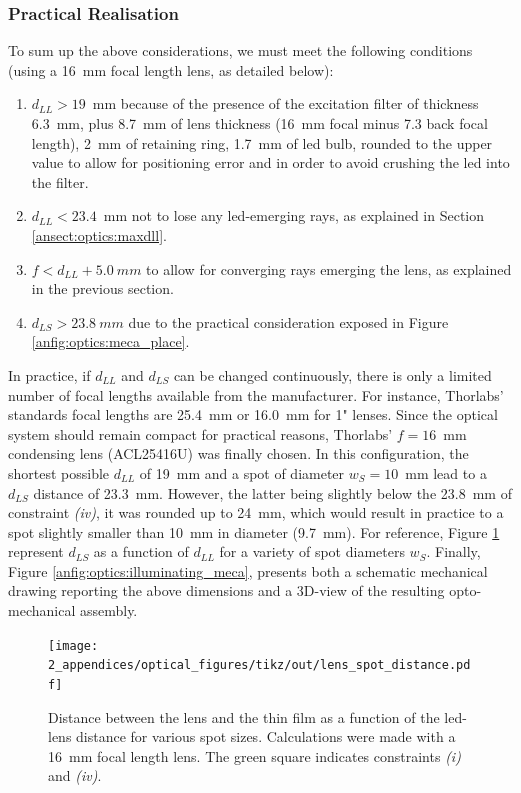 \subsubsection{Practical Realisation}

To sum up the above considerations, we must meet the following conditions (using a 16~mm focal length lens, as detailed below):
\begin{enumerate}[label=\textit{(\roman*)}]
	\item $d_{LL} > 19$~mm because of the presence of the excitation filter of thickness 6.3~mm, plus 8.7~mm of lens thickness (16~mm focal minus 7.3 back focal length), 2~mm of retaining ring, 1.7~mm of \gls{led} bulb, rounded to the upper value to allow for positioning error and in order to avoid crushing the \gls{led} into the filter.
	\item $d_{LL} < 23.4$~mm not to lose any \gls{led}-emerging rays, as explained in Section \ref{ansect:optics:maxdll}.
	\item $f < d_{LL} + 5.0~mm$ to allow for converging rays emerging the lens, as explained in the previous section.
	\item $d_{LS} > 23.8~mm$ due to the practical consideration exposed in Figure \ref{anfig:optics:meca_place}.
\end{enumerate}

In practice, if $d_{LL}$ and $d_{LS}$ can be changed continuously, there is only a limited number of focal lengths available from the manufacturer. For instance, Thorlabs' standards focal lengths are 25.4~mm or 16.0~mm for 1" lenses. Since the optical system should remain compact for practical reasons, Thorlabs' $f=16$~mm condensing lens (ACL25416U) was finally chosen. In this configuration, the shortest possible $d_{LL}$ of 19~mm and a spot of diameter $w_S=10$~mm lead to a $d_{LS}$ distance of 23.3~mm. However, the latter being slightly below the 23.8~mm of constraint \textit{(iv)}, it was rounded up to 24~mm, which would result in practice to a spot slightly smaller than 10~mm in diameter (9.7~mm). For reference, Figure \ref{anfig:optics:lens_spot_distance} represent $d_{LS}$ as a function of $d_{LL}$ for a variety of spot diameters $w_S$. Finally, Figure \ref{anfig:optics:illuminating_meca}, presents both a schematic mechanical drawing reporting the above dimensions and a 3D-view of the resulting opto-mechanical assembly.

\begin{figure}
	\centering
	\texttt{[image: 2\_appendices/optical\_figures/tikz/out/lens\_spot\_distance.pdf]}
	\caption[Distance between the lens and the thin film as a function of the \gls{led}-lens distance for various spot sizes.]{Distance between the lens and the thin film as a function of the \gls{led}-lens distance for various spot sizes. Calculations were made with a 16~mm focal length lens. The green square indicates constraints \textit{(i)} and \textit{(iv)}.}
	\label{anfig:optics:lens_spot_distance}
\end{figure}

